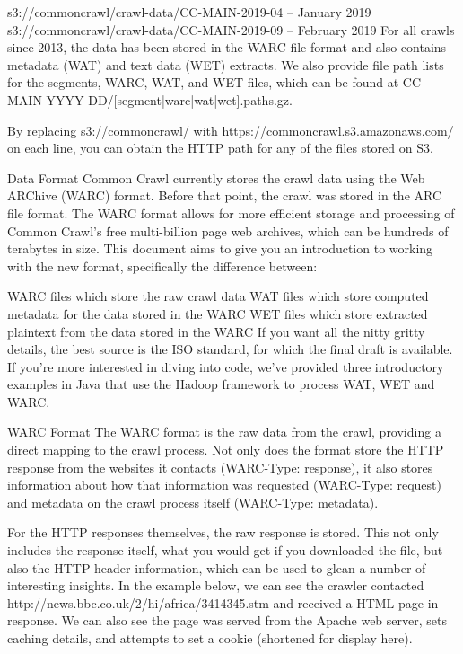 \documentclass{article}
\begin{document}
s3://commoncrawl/crawl-data/CC-MAIN-2019-04 – January 2019
s3://commoncrawl/crawl-data/CC-MAIN-2019-09 – February 2019
For all crawls since 2013, the data has been stored in the WARC file format and also contains metadata (WAT) and text data (WET) extracts. We also provide file path lists for the segments, WARC, WAT, and WET files, which can be found at CC-MAIN-YYYY-DD/[segment|warc|wat|wet].paths.gz.

By replacing s3://commoncrawl/ with https://commoncrawl.s3.amazonaws.com/ on each line, you can obtain the HTTP path for any of the files stored on S3.

Data Format
Common Crawl currently stores the crawl data using the Web ARChive (WARC) format.
Before that point, the crawl was stored in the ARC file format.
The WARC format allows for more efficient storage and processing of Common Crawl’s free multi-billion page web archives, which can be hundreds of terabytes in size.
This document aims to give you an introduction to working with the new format, specifically the difference between:

WARC files which store the raw crawl data
WAT files which store computed metadata for the data stored in the WARC
WET files which store extracted plaintext from the data stored in the WARC
If you want all the nitty gritty details, the best source is the ISO standard, for which the final draft is available.
If you’re more interested in diving into code, we’ve provided three introductory examples in Java that use the Hadoop framework to process WAT, WET and WARC.

WARC Format
The WARC format is the raw data from the crawl, providing a direct mapping to the crawl process. Not only does the format store the HTTP response from the websites it contacts (WARC-Type: response), it also stores information about how that information was requested (WARC-Type: request) and metadata on the crawl process itself (WARC-Type: metadata).

For the HTTP responses themselves, the raw response is stored. This not only includes the response itself, what you would get if you downloaded the file, but also the HTTP header information, which can be used to glean a number of interesting insights.
In the example below, we can see the crawler contacted http://news.bbc.co.uk/2/hi/africa/3414345.stm and received a HTML page in response. We can also see the page was served from the Apache web server, sets caching details, and attempts to set a cookie (shortened for display here).
\end{document}
